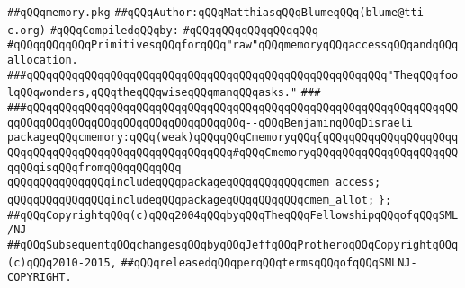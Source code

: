 \label{src/lib/c-glue-lib/ram/memory.pkg}
\verb|##qQQqmemory.pkg|\newline
\verb|##qQQqAuthor:qQQqMatthiasqQQqBlumeqQQq(blume@tti-c.org)|\newline
\newline
\verb|#qQQqCompiledqQQqby:|\newline
\verb|#qQQqqQQqqQQqqQQqqQQq|\newline
\newline
\verb|#qQQqqQQqqQQqPrimitivesqQQqforqQQq"raw"qQQqmemoryqQQqaccessqQQqandqQQqallocation.|\newline
\newline
\newline
\newline
\newline
\verb|###qQQqqQQqqQQqqQQqqQQqqQQqqQQqqQQqqQQqqQQqqQQqqQQqqQQqqQQq"TheqQQqfoolqQQqwonders,qQQqtheqQQqwiseqQQqmanqQQqasks."|\newline
\verb|###|\newline
\verb|###qQQqqQQqqQQqqQQqqQQqqQQqqQQqqQQqqQQqqQQqqQQqqQQqqQQqqQQqqQQqqQQqqQQqqQQqqQQqqQQqqQQqqQQqqQQqqQQqqQQqqQQq--qQQqBenjaminqQQqDisraeli|\newline
\newline
\newline
\newline
\verb|packageqQQqcmemory:qQQq(weak)qQQqqQQqCmemoryqQQq{qQQqqQQqqQQqqQQqqQQqqQQqqQQqqQQqqQQqqQQqqQQqqQQqqQQqqQQq#qQQqCmemoryqQQqqQQqqQQqqQQqqQQqqQQqqQQqisqQQqfromqQQqqQQqqQQq|\newline
\newline
\verb|qQQqqQQqqQQqqQQqincludeqQQqpackageqQQqqQQqqQQqcmem_access;|\newline
\verb|qQQqqQQqqQQqqQQqincludeqQQqpackageqQQqqQQqqQQqcmem_allot;|\newline
\verb|};|\newline
\newline
\newline
\verb|##qQQqCopyrightqQQq(c)qQQq2004qQQqbyqQQqTheqQQqFellowshipqQQqofqQQqSML/NJ|\newline
\verb|##qQQqSubsequentqQQqchangesqQQqbyqQQqJeffqQQqProtheroqQQqCopyrightqQQq(c)qQQq2010-2015,|\newline
\verb|##qQQqreleasedqQQqperqQQqtermsqQQqofqQQqSMLNJ-COPYRIGHT.|\newline

